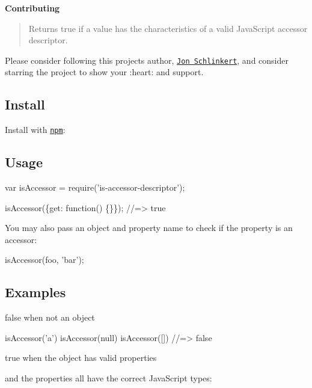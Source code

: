 {\bfseries Contributing}

\begin{quote}
Returns true if a value has the characteristics of a valid Java\+Script accessor descriptor. \end{quote}


Please consider following this project\textquotesingle{}s author, \href{https://github.com/jonschlinkert}{\tt Jon Schlinkert}, and consider starring the project to show your \+:heart\+: and support.

\subsection*{Install}

Install with \href{https://www.npmjs.com/}{\tt npm}\+:




\subsection*{Usage}


\begin{DoxyCode}
var isAccessor = require('is-accessor-descriptor');

isAccessor(\{get: function() \{\}\});
//=> true
\end{DoxyCode}


You may also pass an object and property name to check if the property is an accessor\+:


\begin{DoxyCode}
isAccessor(foo, 'bar');
\end{DoxyCode}


\subsection*{Examples}

{\ttfamily false} when not an object


\begin{DoxyCode}
isAccessor('a')
isAccessor(null)
isAccessor([])
//=> false
\end{DoxyCode}


{\ttfamily true} when the object has valid properties

and the properties all have the correct Java\+Script types\+:


